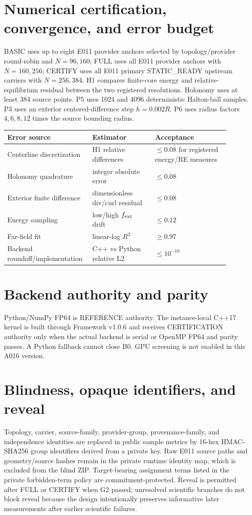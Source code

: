 \documentclass[11pt,a4paper]{article}
\begin{document}
\section{Numerical certification, convergence, and error budget}
BASIC uses up to eight E011 provider anchors selected by topology/provider round-robin and $N=96,160$; FULL uses all E011 provider anchors with $N=160,256$; CERTIFY uses all E011 primary STATIC\_READY upstream carriers with $N=256,384$. H1 compares finite-core energy and relative-equilibrium residual between the two registered resolutions. Holonomy uses at least 384 source points. P5 uses 1024 and 4096 deterministic Halton-ball samples. P3 uses an exterior centered-difference step $h=0.002R$. P6 uses radius factors $4,6,8,12$ times the source bounding radius.

\begin{longtable}{p{0.31\linewidth}p{0.27\linewidth}p{0.32\linewidth}}
\toprule
Error source & Estimator & Acceptance \\
\midrule
Centerline discretization & H1 relative differences & $\le0.08$ for registered energy/RE measures \\
Holonomy quadrature & integer absolute error & $\le0.08$ \\
Exterior finite difference & dimensionless div/curl residual & $\le0.08$ \\
Energy sampling & low/high $f_{\rm ext}$ drift & $\le0.12$ \\
Far-field fit & linear-log $R^2$ & $\ge0.97$ \\
Backend roundoff/implementation & C++ vs Python relative L2 & $\le10^{-10}$ \\
\bottomrule
\end{longtable}

\section{Backend authority and parity}
Python/NumPy FP64 is REFERENCE authority. The instance-local C++17 kernel is built through Framework v1.0.6 and receives CERTIFICATION authority only when the actual backend is serial or OpenMP FP64 and parity passes. A Python fallback cannot close B0. GPU screening is not enabled in this A016 version.

\section{Blindness, opaque identifiers, and reveal}
Topology, carrier, source-family, provider-group, provenance-family, and independence identities are replaced in public sample metrics by 16-hex HMAC-SHA256 group identifiers derived from a private key. Raw E011 source paths and geometry/source hashes remain in the private runtime identity map, which is excluded from the blind ZIP. Target-bearing assignment terms listed in the private forbidden-term policy are commitment-protected. Reveal is permitted after FULL or CERTIFY when G2 passed; unresolved scientific branches do not block reveal because the design intentionally preserves informative later measurements after earlier scientific failures.
\end{document}
